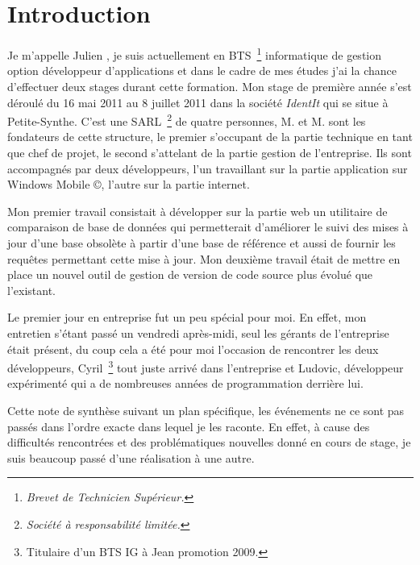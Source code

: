 \chapter{Introduction}

Je m'appelle Julien , je suis actuellement en BTS\,
\footnote{\emph{Brevet de Technicien Supérieur.}} informatique de gestion
option développeur d'applications et dans le cadre de mes études j'ai la chance
d'effectuer deux stages durant cette formation. Mon stage de première année s'est déroulé du 16 mai 2011 au 8 juillet 2011 dans la société \emph{IdentIt}
qui se situe à Petite-Synthe. C'est une SARL\, \footnote{\emph{Société à
responsabilité limitée.}} de quatre personnes, M. et
M. sont les fondateurs de cette structure, le premier s'occupant de
la partie technique en tant que chef de projet, le second s'attelant de la
partie gestion de l'entreprise. Ils sont accompagnés par deux développeurs,
l'un travaillant sur la partie application sur Windows Mobile \copyright,
l'autre sur la partie internet.

Mon premier travail consistait à développer sur la partie web un utilitaire de
comparaison de base de données qui permetterait d'améliorer le suivi des mises
à jour d'une base obsolète à partir d'une base de référence et aussi de fournir
les requêtes permettant cette mise à jour. Mon deuxième travail était de mettre
en place un nouvel outil de gestion de version de code source plus évolué que
l'existant.

Le premier jour en entreprise fut un peu spécial pour moi. En effet, mon
entretien s'étant passé un vendredi après-midi, seul les gérants de
l'entreprise était présent, du coup cela a été pour moi l'occasion de
rencontrer les deux développeurs, Cyril\, \footnote{Titulaire d'un BTS IG à
Jean  promotion 2009.} tout juste arrivé dans l'entreprise et
Ludovic, développeur expérimenté qui a de nombreuses années de programmation
derrière lui.

Cette note de synthèse suivant un plan spécifique, les événements ne ce sont
pas passés dans l'ordre exacte dans lequel je les raconte. En effet, à cause
des difficultés rencontrées et des problématiques nouvelles donné en cours de
stage, je suis beaucoup passé d'une réalisation à une autre.

\clearpage
